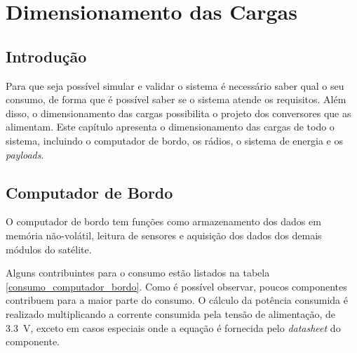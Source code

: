 \chapter{Dimensionamento das Cargas} \label{secao:modelagem_cargas}

\section{Introdução}

Para que seja possível simular e validar o sistema é necessário saber qual o seu consumo, de forma que é possível saber se o sistema atende os requisitos. Além disso, o dimensionamento das cargas possibilita o projeto dos conversores que as alimentam. Este capítulo apresenta o dimensionamento das cargas de todo o sistema, incluindo o computador de bordo, os rádios, o sistema de energia e os \textit{payloads}.

\section{Computador de Bordo}

O computador de bordo tem funções como armazenamento dos dados em memória não-volátil, leitura de sensores e aquisição dos dados dos demais módulos do satélite.

Alguns contribuintes para o consumo estão listados na tabela \ref{consumo_computador_bordo}. Como é possível observar, poucos componentes contribuem para a maior parte do consumo. O cálculo da potência consumida é realizado multiplicando a corrente consumida pela tensão de alimentação, de \SI{3,3}{\volt}, exceto em casos especiais onde a equação é fornecida pelo \textit{datasheet} do componente.

